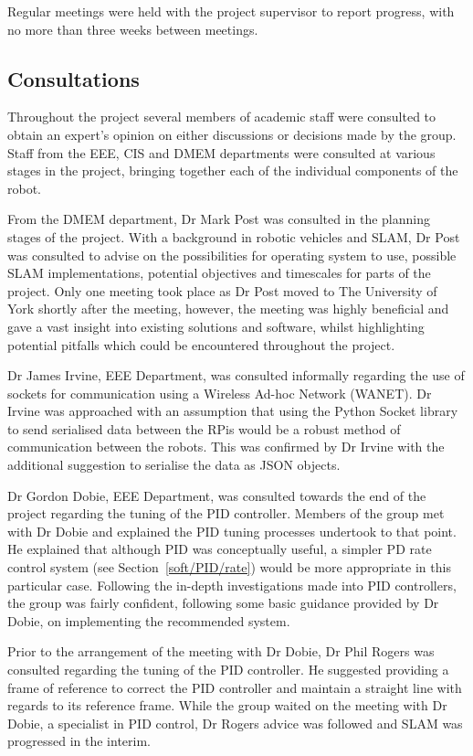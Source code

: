 Regular meetings were held with the project supervisor to report progress, with no
more than three weeks between meetings.

\subsection{Consultations}\label{pm/consultations}
Throughout the project several members of academic staff
were consulted to obtain an expert's opinion on either
discussions or decisions made by the group.
Staff from the EEE, CIS and DMEM departments were
consulted at various stages in the project, bringing together
each of the individual components of the robot.

From the DMEM department, Dr Mark Post
was consulted in the planning stages of the project. With a
background in robotic vehicles and SLAM, Dr Post was consulted
to advise on the possibilities for operating system to use,
possible SLAM implementations, potential objectives and
timescales for parts of the project. Only one meeting took place
as Dr Post moved to The University of York shortly after the meeting,
however, the meeting was highly beneficial and gave a vast
insight into existing solutions and software, whilst highlighting
potential pitfalls which could be encountered throughout
the project.

Dr James Irvine, EEE Department, was consulted informally
regarding the use of sockets for communication using a Wireless
Ad-hoc Network (WANET). Dr Irvine was approached with an
assumption that using the Python Socket library to send
serialised data between the RPis would be a robust
method of communication between the robots. This was confirmed
by Dr Irvine with the additional suggestion to serialise the data
as JSON objects.


Dr Gordon Dobie, EEE Department, was consulted towards the end
of the project regarding the tuning of the PID controller.
Members of the group met with Dr Dobie and explained the PID tuning
processes undertook to that point. He explained that although
PID was conceptually useful, a simpler PD rate control system (see Section~\ref{soft/PID/rate}) would be more appropriate
in this particular case. Following the in-depth investigations made
into PID controllers, the group was fairly confident, following some
basic guidance provided by Dr Dobie, on implementing the
recommended system.

Prior to the arrangement of the meeting with Dr Dobie, Dr Phil
Rogers was consulted regarding the tuning of the PID controller.
He suggested providing a frame of reference to correct
the PID controller and maintain a straight line with regards to
its reference frame. While the group waited on the meeting with
Dr Dobie, a specialist in PID control, Dr Rogers advice was
followed and SLAM was progressed in the interim.

